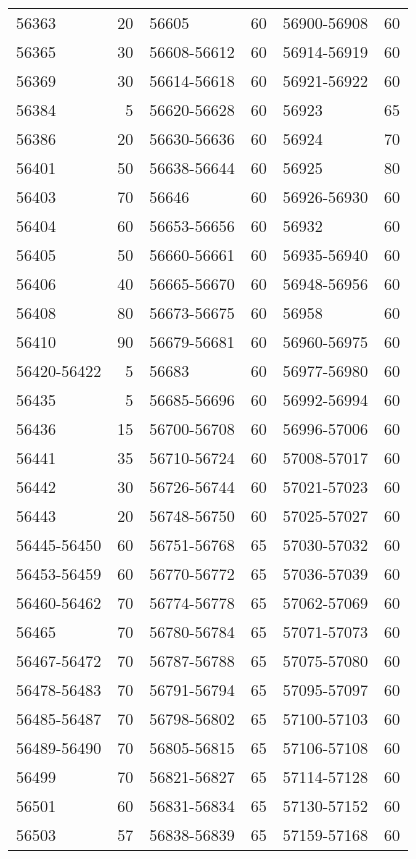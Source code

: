 \begin{center}
\begin{singlespacing}
\begin{longtable}{lr|lr|lr}
56363 & 20 & 56605 & 60 & 56900-56908 & 60 \\
56365 & 30 & 56608-56612 & 60 & 56914-56919 & 60 \\
56369 & 30 & 56614-56618 & 60 & 56921-56922 & 60 \\
56384 & 5 & 56620-56628 & 60 & 56923 & 65 \\
56386 & 20 & 56630-56636 & 60 & 56924 & 70 \\
56401 & 50 & 56638-56644 & 60 & 56925 & 80 \\
56403 & 70 & 56646 & 60 & 56926-56930 & 60 \\
56404 & 60 & 56653-56656 & 60 & 56932 & 60 \\
56405 & 50 & 56660-56661 & 60 & 56935-56940 & 60 \\
56406 & 40 & 56665-56670 & 60 & 56948-56956 & 60 \\
56408 & 80 & 56673-56675 & 60 & 56958 & 60 \\
56410 & 90 & 56679-56681 & 60 & 56960-56975 & 60 \\
56420-56422 & 5 & 56683 & 60 & 56977-56980 & 60 \\
56435 & 5 & 56685-56696 & 60 & 56992-56994 & 60 \\
56436 & 15 & 56700-56708 & 60 & 56996-57006 & 60 \\
56441 & 35 & 56710-56724 & 60 & 57008-57017 & 60 \\
56442 & 30 & 56726-56744 & 60 & 57021-57023 & 60 \\
56443 & 20 & 56748-56750 & 60 & 57025-57027 & 60 \\
56445-56450 & 60 & 56751-56768 & 65 & 57030-57032 & 60 \\
56453-56459 & 60 & 56770-56772 & 65 & 57036-57039 & 60 \\
56460-56462 & 70 & 56774-56778 & 65 & 57062-57069 & 60 \\
56465 & 70 & 56780-56784 & 65 & 57071-57073 & 60 \\
56467-56472 & 70 & 56787-56788 & 65 & 57075-57080 & 60 \\
56478-56483 & 70 & 56791-56794 & 65 & 57095-57097 & 60 \\
56485-56487 & 70 & 56798-56802 & 65 & 57100-57103 & 60 \\
56489-56490 & 70 & 56805-56815 & 65 & 57106-57108 & 60 \\
56499 & 70 & 56821-56827 & 65 & 57114-57128 & 60 \\
56501 & 60 & 56831-56834 & 65 & 57130-57152 & 60 \\
56503 & 57 & 56838-56839 & 65 & 57159-57168 & 60 \\

\end{longtable}
\end{singlespacing}
\end{center}
